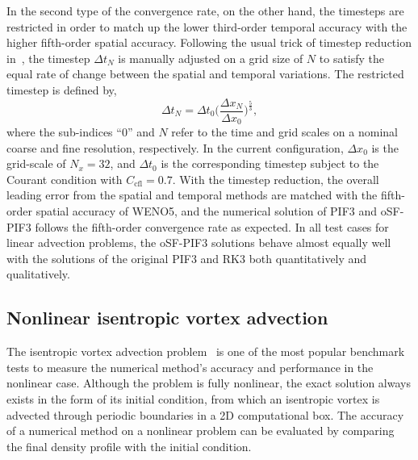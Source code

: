 In the second type of the convergence rate, on the other hand, the timesteps are restricted
in order to match up the lower third-order temporal accuracy with the higher fifth-order spatial accuracy.
Following the usual trick of timestep reduction in~\cite{mignone2010high},
the timestep \( \Delta t_{N} \) is manually adjusted on a grid size of \( N \)
to satisfy the equal rate of change between the spatial and temporal variations.
The restricted timestep is defined by,
\begin{equation}\label{eq:dt_reduction}
    {\Delta t_N} = {\Delta t_0} \Big( \frac{\Delta x_N}{\Delta x_0} \Big)^{\frac{5}{3}},
\end{equation}
where the sub-indices ``0'' and \( N \) refer to the time and grid scales
on a nominal coarse and fine resolution, respectively.
In the current configuration, \( \Delta x_{0} \) is the grid-scale of \( N_{x} = 32 \),
and \( \Delta t_{0} \) is the corresponding timestep subject to the Courant condition with \( C_{\text{cfl}} = 0.7 \).
With the timestep reduction, the overall leading error from the spatial and temporal methods
are matched with the fifth-order spatial accuracy of WENO5,
and the numerical solution of PIF3 and oSF-PIF3 follows the fifth-order convergence rate as expected.
In all test cases for linear advection problems, the oSF-PIF3 solutions behave
almost equally well with the solutions of the original PIF3 and RK3 both quantitatively and qualitatively.



\subsection{Nonlinear isentropic vortex advection}\label{subsec:vortex}

The isentropic vortex advection problem~\cite{shu1998essentially} is one of the most popular benchmark tests
to measure the numerical method's accuracy and performance in the nonlinear case.
Although the problem is fully nonlinear, the exact solution always exists
in the form of its initial condition,
from which an isentropic vortex is advected through periodic boundaries in a 2D computational box.
The accuracy of a numerical method on a nonlinear problem
can be evaluated by comparing the final density profile with the initial condition.

